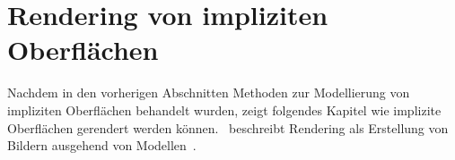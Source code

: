 
\section{Rendering von impliziten Oberflächen}
\label{sec:rendering_implicit_surfaces}

Nachdem in den vorherigen Abschnitten Methoden zur Modellierung von
impliziten Oberflächen behandelt wurden, zeigt folgendes Kapitel wie
implizite Oberflächen gerendert werden
können.~\citeauthor{foley_computer_1996} beschreibt Rendering
als Erstellung von Bildern ausgehend von
Modellen~\parencite[S. 606]{foley_computer_1996}.




